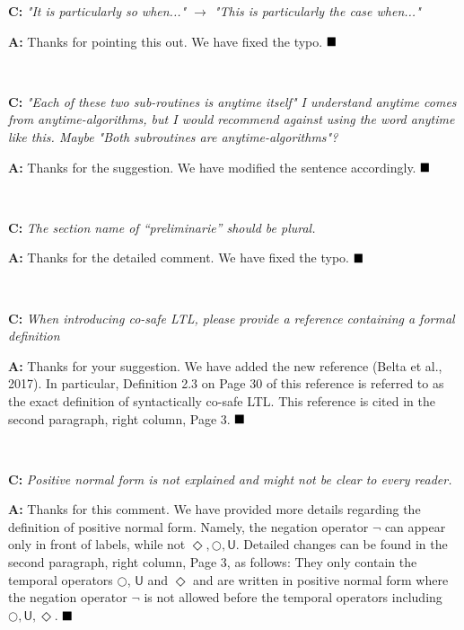 \documentclass[10pt]{article}
\begin{document}

\textbf{C:}
\emph{ "It is particularly so when..." $\rightarrow$ "This is particularly the case when..."
}


\textbf{A:} Thanks for pointing this out. We have fixed the typo.
$\hfill\blacksquare$

\hspace*{\fill} \


\textbf{C:}
\emph{"Each of these two sub-routines is anytime itself"
	I understand anytime comes from anytime-algorithms, but I would recommend against using
	the word anytime like this. Maybe "Both subroutines are anytime-algorithms"?
}

\textbf{A:} Thanks for the suggestion. We have modified the sentence accordingly.
$\hfill\blacksquare$

\hspace*{\fill} \


\textbf{C:}
\emph{The section name of ``preliminarie'' should be plural.
}


\textbf{A:} Thanks for the detailed comment. We have fixed the typo.
$\hfill\blacksquare$

\hspace*{\fill} \


\textbf{C:}
\emph{ When introducing co-safe LTL, please provide a reference containing a formal definition
}

\textbf{A:} Thanks for your suggestion.
We have added the new reference (Belta et al., 2017).
In particular, Definition 2.3 on Page 30 of this reference is referred to
as the exact definition of syntactically co-safe LTL. This reference is cited in the second paragraph, right column, Page 3.
$\hfill\blacksquare$

\hspace*{\fill} \


\textbf{C:}
\emph{ Positive normal form is not explained and might not be clear to every reader.
}

\textbf{A:} Thanks for this comment.
We have provided more details regarding the definition of positive normal form.
Namely, the negation operator $\neg$ can appear only in
front of labels, while not $\Diamond, \bigcirc, \textsf{U}$.
Detailed changes can be found in the second paragraph, right column, Page 3, as follows:
They only contain the temporal operators $\bigcirc$, $\textsf{U}$ and $\Diamond$
and are written in positive normal form where the negation
	operator $\neg$ is not allowed before the temporal
	operators including~$\bigcirc, \textsf{U}, \Diamond$.
$\hfill\blacksquare$
\end{document}
